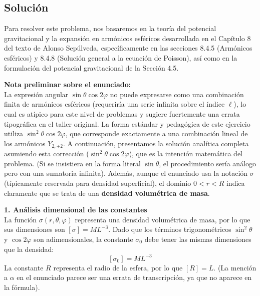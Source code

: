 \documentclass[a4paper]{article}
\begin{document}
\subsection{Solución}
Para resolver este problema, nos basaremos en la teoría del potencial gravitacional y la expansión en armónicos esféricos desarrollada en el Capítulo 8 del texto de Alonso Sepúlveda, específicamente en las secciones 8.4.5 (Armónicos esféricos) y 8.4.8 (Solución general a la ecuación de Poisson), así como en la formulación del potencial gravitacional de la Sección 4.5.

\vspace{0.3cm}
\noindent\textbf{Nota preliminar sobre el enunciado:} \\
La expresión angular $\sin\theta \cos 2\varphi$ no puede expresarse como una combinación finita de armónicos esféricos (requeriría una serie infinita sobre el índice $\ell$), lo cual es atípico para este nivel de problemas y sugiere fuertemente una errata tipográfica en el taller original. La forma estándar y pedagógica de este ejercicio utiliza $\sin^2\theta \cos 2\varphi$, que corresponde exactamente a una combinación lineal de los armónicos $Y_{2, \pm 2}$. A continuación, presentamos la solución analítica completa asumiendo esta corrección ($\sin^2\theta \cos 2\varphi$), que es la intención matemática del problema. (Si se insistiera en la forma literal $\sin\theta$, el procedimiento sería análogo pero con una sumatoria infinita). Además, aunque el enunciado usa la notación $\sigma$ (típicamente reservada para densidad superficial), el dominio $0 < r < R$ indica claramente que se trata de una \textbf{densidad volumétrica de masa}.

\vspace{0.3cm}
\noindent\textbf{1. Análisis dimensional de las constantes} \\
La función $\sigma(r, \theta, \varphi)$ representa una densidad volumétrica de masa, por lo que sus dimensiones son $[\sigma] = M L^{-3}$. Dado que los términos trigonométricos $\sin^2\theta$ y $\cos 2\varphi$ son adimensionales, la constante $\sigma_0$ debe tener las mismas dimensiones que la densidad:
$$
[\sigma_0] = M L^{-3}
$$
La constante $R$ representa el radio de la esfera, por lo que $[R] = L$. (La mención a $\alpha$ en el enunciado parece ser una errata de transcripción, ya que no aparece en la fórmula).
\end{document}
